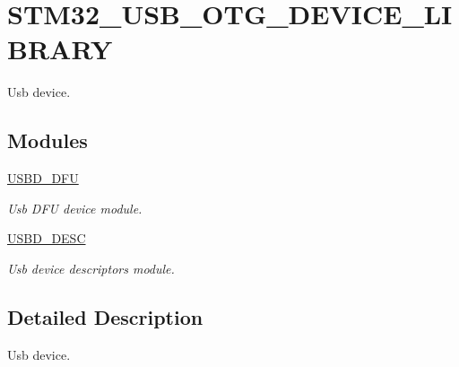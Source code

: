 \hypertarget{group__STM32__USB__OTG__DEVICE__LIBRARY}{}\section{S\+T\+M32\+\_\+\+U\+S\+B\+\_\+\+O\+T\+G\+\_\+\+D\+E\+V\+I\+C\+E\+\_\+\+L\+I\+B\+R\+A\+RY}
\label{group__STM32__USB__OTG__DEVICE__LIBRARY}


Usb device.  


\subsection*{Modules}
\begin{DoxyCompactItemize}
\item 
\hyperlink{group__USBD__DFU}{U\+S\+B\+D\+\_\+\+D\+FU}
\begin{DoxyCompactList}\small\item\em Usb D\+FU device module. \end{DoxyCompactList}\item 
\hyperlink{group__USBD__DESC}{U\+S\+B\+D\+\_\+\+D\+E\+SC}
\begin{DoxyCompactList}\small\item\em Usb device descriptors module. \end{DoxyCompactList}\end{DoxyCompactItemize}


\subsection{Detailed Description}
Usb device. 

